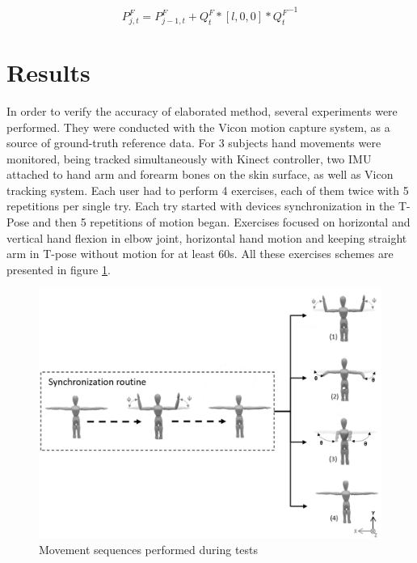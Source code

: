 \documentclass[sensors,article,submit,moreauthors,pdftex,10pt,a4paper]{mdpi}
\begin{document}
	\begin{equation} 	
		P_{j,t}^F=P_{j-1,t}^F+Q_t^F*[l,0,0]*{Q_t^F}^{-1}     
		\label{eq:hybrid:positionCalculationForm}              	
	\end{equation}
	
	\section{Results}
	
	
	In order to verify the accuracy of elaborated method, several experiments were performed. They were conducted with the Vicon motion capture system, as a source of ground-truth reference data. For 3 subjects hand movements were monitored, being tracked simultaneously with Kinect controller, two IMU attached to hand arm and forearm bones on the skin surface, as well as Vicon tracking system. Each user had to perform 4 exercises, each of them twice with 5 repetitions per single try. Each try started with devices synchronization in the T-Pose and then 5 repetitions of motion began. Exercises focused on horizontal and vertical hand flexion in elbow joint, horizontal hand motion and keeping straight arm in T-pose without motion for at least 60s. All these exercises schemes are presented in figure \ref{fig:results:sequences}.
	
	\begin{figure}[H]
		\centering
		\includegraphics[width=12cm]{Figure8.png}
		\caption{Movement sequences performed during tests}
		\label{fig:results:sequences}
	\end{figure}
	
\end{document}
